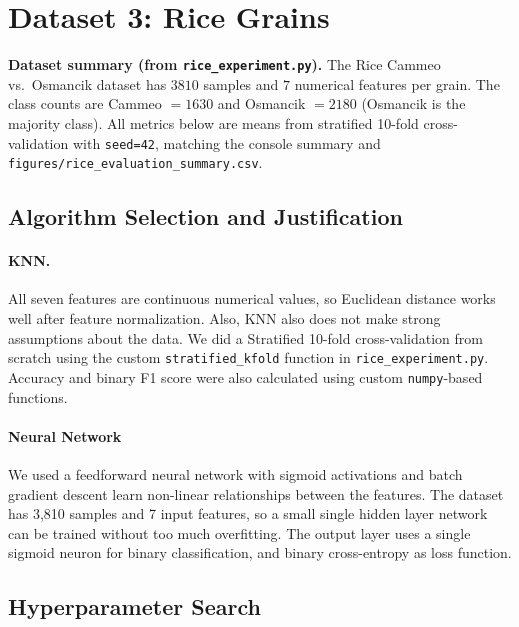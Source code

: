 \documentclass[11pt,letterpaper]{article}
\begin{document}
\section{Dataset 3: Rice Grains}

\noindent\textbf{Dataset summary (from \texttt{rice\_experiment.py}).}
The Rice Cammeo vs.\ Osmancik dataset has $3810$ samples and $7$ numerical features per grain.
The class counts are Cammeo $=1630$ and Osmancik $=2180$ (Osmancik is the majority class).
All metrics below are means from stratified 10-fold cross-validation with \texttt{seed=42},
matching the console summary and \texttt{figures/rice\_evaluation\_summary.csv}.

\subsection{Algorithm Selection and Justification}

\paragraph{KNN.}
All seven features are continuous numerical values, so Euclidean distance works well after feature normalization. Also, KNN also does not make strong
assumptions about the data. We did a Stratified 10-fold cross-validation from scratch using the custom
\texttt{stratified\_kfold} function in \texttt{rice\_experiment.py}.
Accuracy and binary F1 score were also calculated using custom
\texttt{numpy}-based functions.

\paragraph{Neural Network}
We used a feedforward neural network with sigmoid activations and batch gradient
descent learn non-linear relationships between the features.
The dataset has 3,810 samples and 7 input features, so a small single hidden layer network can be trained without too much overfitting.
The output layer uses a single sigmoid neuron for binary classification, and binary cross-entropy as loss function.

\subsection{Hyperparameter Search}
\end{document}
